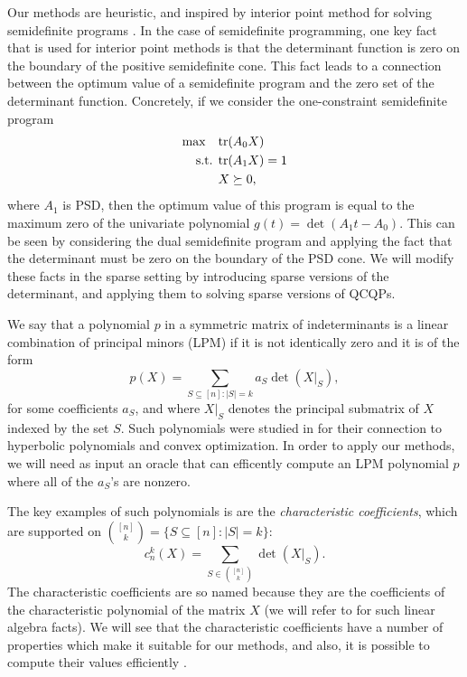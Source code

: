 \documentclass{amsart}
\theoremstyle{definition}
\newcommand{\tr}{\textup{tr}}
\newcommand{\st}{{\text{ s.t. }}}
\begin{document}
Our methods are heuristic, and inspired by interior point method for solving semidefinite programs \cite{alizadeh1995interior, ben2001lectures}.
In the case of semidefinite programming, one key fact that is used for interior point methods is that the determinant function is zero on the boundary of the positive semidefinite cone.
This fact leads to a connection between the optimum value of a semidefinite program and the zero set of the determinant function.
Concretely, if we consider the one-constraint semidefinite program
\begin{equation}
    \begin{aligned}
        \max\quad & \tr(A_0X)\\
        \st & \tr(A_1X) = 1\\
            & X \succeq 0,
    \end{aligned}
\end{equation}
where $A_1$ is PSD, then the optimum value of this program is equal to the maximum zero of the univariate polynomial $g(t) = \det(A_1 t - A_0)$.
This can be seen by considering the dual semidefinite program and applying the fact that the determinant must be zero on the boundary of the PSD cone.
We will modify these facts in the sparse setting by introducing sparse versions of the determinant, and applying them to solving sparse versions of QCQPs.

We say that a polynomial $p$ in a symmetric matrix of indeterminants is a linear combination of principal minors (LPM) if it is not identically zero and it is of the form
\[
    p(X) = \sum_{S \subseteq [n] : |S| = k} a_S\det(X|_S),
\]
for some coefficients $a_S$, and where $X|_S$ denotes the principal submatrix of $X$ indexed by the set $S$.
Such polynomials were studied in \cite{blekherman2021linear} for their connection to hyperbolic polynomials and convex optimization.
In order to apply our methods, we will need as input an oracle that can efficently compute an LPM polynomial $p$ where all of the $a_S$'s are nonzero.

The key examples of such polynomials is are the \emph{characteristic coefficients}, which are supported on $\binom{[n]}{k} = \{S \subseteq [n] : |S| = k\}$:
\[
    c_n^k(X) = \sum_{S \in \binom{[n]}{k}} \det(X|_S).
\]
The characteristic coefficients are so named because they are the coefficients of the characteristic polynomial of the matrix $X$ (we will refer to \cite{horn2012matrix} for such linear algebra facts).
We will see that the characteristic coefficients have a number of properties which make it suitable for our methods, and also, it is possible to compute their values efficiently \cite{baer2021faddeev}.
\end{document}
